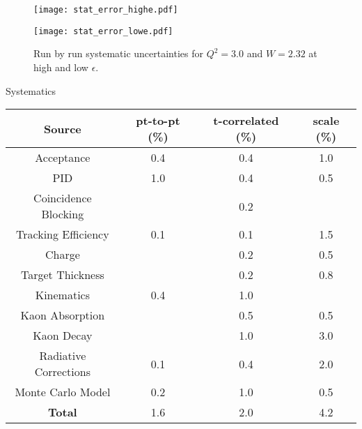 \begin{figure}
  \centering
  \begin{minipage}[b]{0.48\linewidth}
    \texttt{[image: stat\_error\_highe.pdf]}
  \end{minipage}
  \hfill
  \begin{minipage}[b]{0.48\linewidth}
    \texttt{[image: stat\_error\_lowe.pdf]}
  \end{minipage}
  
  \caption{Run by run systematic uncertainties for $Q^2=3.0$ and $W=2.32$ at high and low $\epsilon$.}
  \label{fig:7-1_stat_error_data}
\end{figure}

\begin{Mtable}{Systematics}
  \centering
  \begin{tabular}{|c|c|c|c|}
    \hline
    \textbf{Source} & \textbf{pt-to-pt (\%)} & \textbf{t-correlated (\%)} & \textbf{scale (\%)} \\
    \hline    
    Acceptance            & 0.4  & 0.4  & 1.0 \\
    PID                   & 1.0  & 0.4  & 0.5 \\
    Coincidence Blocking  &      & 0.2  &     \\
    Tracking Efficiency   & 0.1  & 0.1  & 1.5 \\
    Charge                &      & 0.2  & 0.5 \\
    Target Thickness      &      & 0.2  & 0.8 \\
    Kinematics            & 0.4  & 1.0  &     \\
    Kaon Absorption       &      & 0.5  & 0.5 \\
    Kaon Decay            &      & 1.0  & 3.0 \\
    Radiative Corrections & 0.1  & 0.4  & 2.0 \\
    Monte Carlo Model     & 0.2  & 1.0  & 0.5 \\
    \hline    
    \textbf{Total}        & 1.6  & 2.0  & 4.2 \\
    \hline
    \end{tabular}
  \caption{Modified version of the PAC 34 proposed systematic uncertainties. Thse systematic uncertainties were  estimated based on prior Hall C experiments. One addition to the table is the inclusion of a PID pt-to-pt systematic to take into account the hole in the SHMS HGCer.}
  \label{tab:7-1_pac_error}
\end{Mtable}

